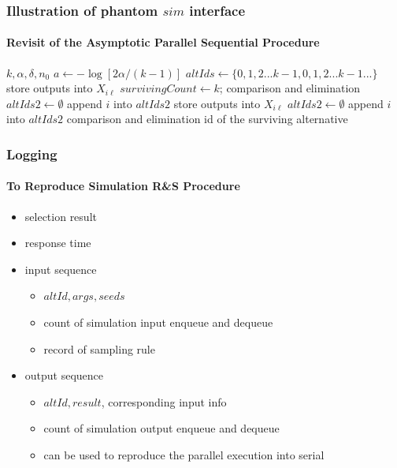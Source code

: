 \documentclass{beamer}
\begin{document}
\begin{frame}
\frametitle{Illustration of phantom $sim$ interface}
\framesubtitle{Revisit of the Asymptotic Parallel Sequential Procedure}
\tiny
{
\begin{algorithmic}[1]
\Require $k, \alpha, \delta, n_0$
\State $a \gets - \log{[2\alpha / (k - 1)]}$
\State $altIds \gets \{0, 1, 2...k - 1, 0, 1, 2...k - 1...\}$ 
\State store outputs into $X_{i\ell}$
\State $survivingCount \gets k$;
\State comparison and elimination
\State $altIds2 \gets \emptyset$
    \State append $i$ into $altIds2$
  \EndIf
\EndFor
{}
  \State store {\color{blue} outputs} into $X_{i\ell}$
    \State $altIds2 \gets \emptyset$
        \State append $i$ into $altIds2$
      \EndIf
    \EndFor
     
    \State comparison and elimination
  \EndIf
\EndWhile
\State \Return id of the surviving alternative
\end{algorithmic}
}
\end{frame}

\begin{frame}
\frametitle{Logging}
\framesubtitle{To Reproduce Simulation R\&S Procedure}
\begin{itemize}
\item selection result
\item response time
\item input sequence
\begin{itemize}
\item $altId, args, seeds$
\item count of simulation input enqueue and dequeue
\item record of sampling rule
\end{itemize}
\item output sequence
\begin{itemize}
\item $altId, result$, corresponding input info
\item count of simulation output enqueue and dequeue
\item {\color{blue} can be used to reproduce the parallel execution into serial}
\end{itemize}
\end{itemize}
\end{frame}
\end{document}
